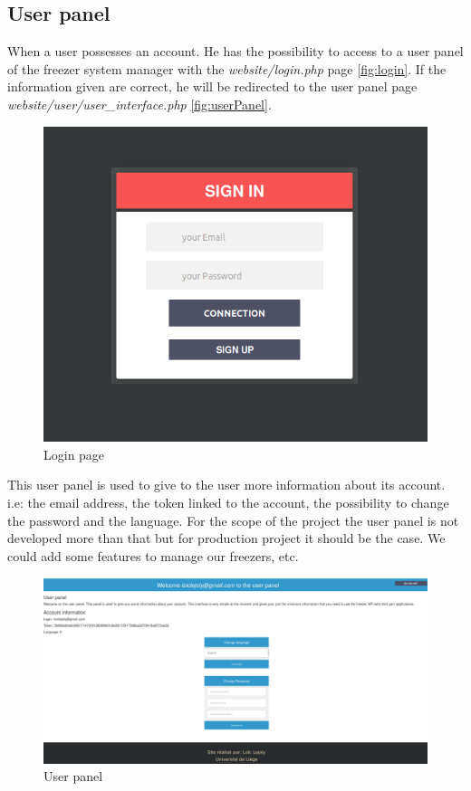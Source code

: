 \subsection{User panel}
When a user possesses an account. He has the possibility to access to a user panel of the freezer system manager with the \textit{website/login.php} page \autoref{fig:login}. If the information given are correct, he will be redirected to the user panel page \textit{website/user/user\_interface.php} \autoref{fig:userPanel}.
\begin{figure}[H]
\centering
\includegraphics[scale=0.3]{./images/login.png}
\caption{Login page}
\label{fig:login}
\end{figure}

This user panel is used to give to the user more information about its account. i.e: the email address, the token linked to the account, the possibility to change the password and the language. For the scope of the project the user panel is not developed more than that but for production project it should be the case. We could add some features to manage our freezers, etc.

\begin{figure}[H]
\centering
\includegraphics[scale=0.25]{./images/userPanel.png}
\caption{User panel}
\label{fig:userPanel}
\end{figure}
